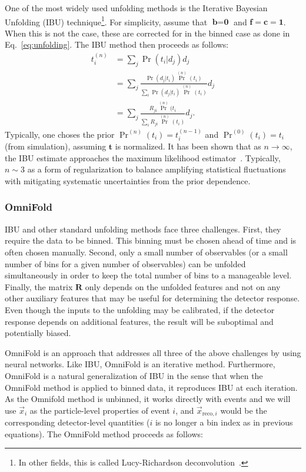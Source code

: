 One of the most widely used unfolding methods is the Iterative Bayesian Unfolding (IBU) technique\footnote{In other fields, this is called Lucy-Richardson deconvolution~\cite{1974AJ.....79..745L,Richardson:72}.}.   For simplicity, assume that $\textbf{b}=\textbf{0}$ and $\textbf{f}=\textbf{c}=\textbf{1}$.  When this is not the case, these are corrected for in the binned case as done in Eq.~\ref{eq:unfolding}.   The IBU method then proceeds as follows:
\begin{align}
t_i^{(n)}&=\sum_j \Pr(t_i|d_j) d_j \\
&=\sum_j \frac{\Pr(d_j|t_i)\Pr^{(n)}(t_i)}{\sum_i \Pr(d_j|t_i)\Pr^{(n)}(t_i)} d_j \\
&=\sum_j \frac{R_{ji}\Pr^{(n)}(t_i}{\sum_i R_{ji}\Pr^{(n)}(t_i)} d_j.
\end{align}
%
Typically, one choses the prior $\Pr^{(n)}(t_i)=t_i^{(n-1)}$ and $\Pr^{(0)}(t_i)=t_i$ (from simulation), assuming $\textbf{t}$ is normalized.  It has been shown that as $n\rightarrow\infty$, the IBU estimate approaches the maximum likelihood estimator~\cite{shepp1982maximum}.  Typically, $n\sim 3$ as a form of regularization to balance amplifying statistical fluctuations with mitigating systematic uncertainties from the prior dependence.

\subsubsection{OmniFold}
\label{subsec:omnifold}

IBU and other standard unfolding methods face three challenges.  First, they require the data to be binned.  This binning must be chosen ahead of time and is often chosen manually.  Second, only a small number of observables (or a small number of bins for a given number of observables) can be unfolded simultaneously in order to keep the total number of bins to a manageable level.  Finally, the matrix $\textbf{R}$ only depends on the unfolded features and not on any other auxiliary features that may be useful for determining the detector response.  Even though the inputs to the unfolding may be calibrated, if the detector response depends on additional features, the result will be suboptimal and potentially biased.

OmniFold is an approach that addresses all three of the above challenges by using neural networks.  Like IBU, OmniFold is an iterative method.  Furthermore, OmniFold is a natural generalization of IBU in the sense that when the OmniFold method is applied to binned data, it reproduces IBU at each iteration.  
As the Omnifold method is unbinned, it works directly with events and we will use $\vec{x}_i$ as the particle-level properties of event $i$, and $\vec{x}_{\mathrm{reco},i}$ would be the corresponding detector-level quantities ($i$ is no longer a bin index as in previous equations).
The OmniFold method proceeds as follows:

